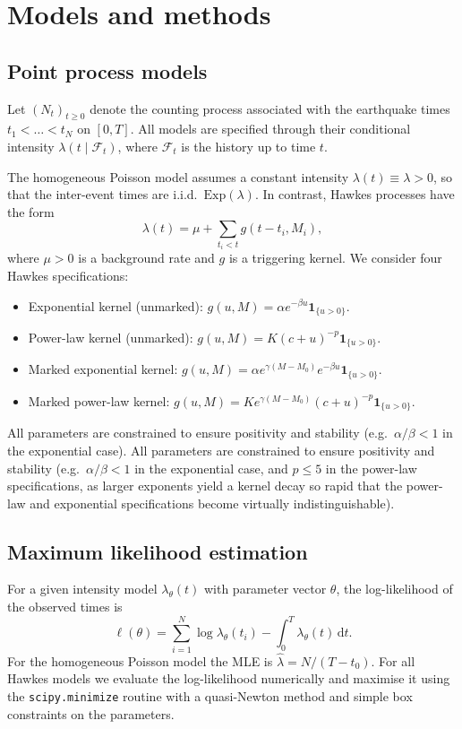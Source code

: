 \section{Models and methods}
\label{sec:analysis}

\subsection{Point process models}

Let $(N_t)_{t\ge 0}$ denote the counting process associated with the
earthquake times $t_1 < \dots < t_N$ on $[0,T]$. All models are
specified through their conditional intensity
$\lambda(t \mid \mathcal{F}_t)$, where $\mathcal{F}_t$ is the history
up to time $t$.

The homogeneous Poisson model assumes a constant intensity
$\lambda(t) \equiv \lambda > 0$, so that the inter-event times are
i.i.d.\ $\mathrm{Exp}(\lambda)$. In contrast, Hawkes processes have the
form
\[
  \lambda(t) = \mu + \sum_{t_i < t} g(t - t_i, M_i),
\]
where $\mu > 0$ is a background rate and $g$ is a triggering kernel.
We consider four Hawkes specifications:
\begin{itemize}
  \item Exponential kernel (unmarked):
    $g(u,M) = \alpha e^{-\beta u} \mathbf{1}_{\{u>0\}}$.
  \item Power-law kernel (unmarked):
    $g(u,M) = K (c+u)^{-p} \mathbf{1}_{\{u>0\}}$.
  \item Marked exponential kernel:
    $g(u,M) = \alpha e^{\gamma (M-M_0)} e^{-\beta u} \mathbf{1}_{\{u>0\}}$.
  \item Marked power-law kernel:
    $g(u,M) = K e^{\gamma (M-M_0)} (c+u)^{-p} \mathbf{1}_{\{u>0\}}$.
\end{itemize}
All parameters are constrained to ensure positivity and stability
(e.g.\ $\alpha/\beta < 1$ in the exponential case).
All parameters are constrained to ensure positivity and stability
(e.g.\ $\alpha/\beta < 1$ in the exponential case, and $p \leq 5$
in the power-law specifications, as larger exponents yield a kernel
decay so rapid that the power-law and exponential specifications
become virtually indistinguishable).

\subsection{Maximum likelihood estimation}

For a given intensity model $\lambda_\theta(t)$ with parameter vector
$\theta$, the log-likelihood of the observed times is
\[
\ell(\theta)
  = \sum_{i=1}^N \log \lambda_\theta(t_i)
    - \int_0^T \lambda_\theta(t)\, \mathrm{d}t.
\]
For the homogeneous Poisson model the MLE is
$\hat{\lambda} = N / (T - t_0)$. For all Hawkes models we evaluate the
log-likelihood numerically and maximise it using the \texttt{scipy.minimize}
routine with a quasi-Newton method and simple box constraints on the
parameters.

